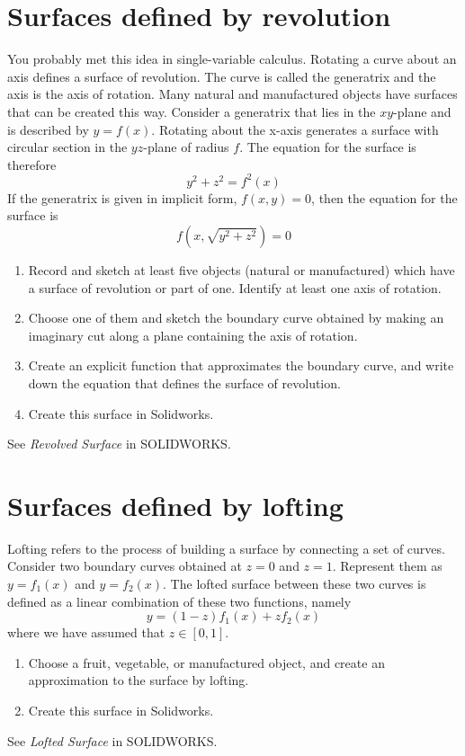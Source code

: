 \documentclass{tufte-handout}
\begin{document}
\section{Surfaces defined by revolution}

You probably met this idea in single-variable calculus. Rotating a curve about an axis defines a surface of revolution. The curve is called the generatrix and the axis is the axis of rotation. Many natural and manufactured objects have surfaces that can be created this way. Consider a generatrix that lies in the $xy$-plane and is described by $y=f(x)$. Rotating about the x-axis generates a surface with circular section in the $yz$-plane of radius $f$. The equation for the surface is therefore
\[y^2 + z^2 = f^2(x) \]
If the generatrix is given in implicit form, $f(x,y) = 0$, then the equation for the surface is
\[f(x,\sqrt{y^2+z^2}) = 0\]


\begin{enumerate}[resume]
\item Record and sketch at least five objects (natural or manufactured) which have a surface of revolution or part of one. Identify at least one axis of rotation.
\item Choose one of them and sketch the boundary curve obtained by making an imaginary cut along a plane containing the axis of rotation.
\item Create an explicit function that approximates the boundary curve, and write down the equation that defines the surface of revolution.
\item  Create this surface in Solidworks.
\end{enumerate}

See {\it Revolved Surface} in SOLIDWORKS.

\section{Surfaces defined by lofting}

Lofting refers to the process of building a surface by connecting a set of curves. Consider two boundary curves obtained at $z=0$ and $z=1$. Represent them as $y=f_1(x)$ and $y=f_2(x)$. The lofted surface between these two curves is defined as a linear combination of these two functions, namely
\[y = (1-z) f_1(x) + z f_2(x) \]
where we have assumed that $z \in [0,1]$.


\begin{enumerate}[resume]
\item Choose a fruit, vegetable, or manufactured object, and create an approximation to the surface by lofting.
\item  Create this surface in Solidworks.
\end{enumerate}

See {\it Lofted Surface} in SOLIDWORKS.
\end{document}
